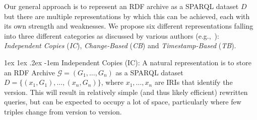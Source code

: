 \documentclass[a4paper]{llncs}
\makeatletter
\renewcommand\paragraph{\@startsection{paragraph}{4}{\z@}%
	{1ex \@plus1ex \@minus.2ex}%
	{-1em}%
	{\normalfont\normalsize\itshape}}
\makeatother
\begin{document}
Our general approach is to represent an RDF archive as a SPARQL dataset $D$ but there are multiple representations by which this can be achieved, each with its own strength and weaknesses. We propose six different representations falling into three different categories as discussed by various authors (e.g.,~\cite{TzitzikasTA08,FernandezPU15}): \textit{Independent Copies} (\textit{IC}), \textit{Change-Based} (\textit{CB}) and \textit{Timestamp-Based} (\textit{TB}).

\newcommand{\ic}{\textsc{i}\xspace}
\newcommand{\cbpd}{\ensuremath{\textsc{c}_d^{+}}\xspace}
\newcommand{\cbpi}{\ensuremath{\textsc{c}_i^{+}}\xspace}
\newcommand{\cbmd}{\ensuremath{\textsc{c}_d^{-}}\xspace}
\newcommand{\cbmi}{\ensuremath{\textsc{c}_i^{-}}\xspace}
\newcommand{\cbi}{\ensuremath{\textsc{c}_i}\xspace}
\newcommand{\cbd}{\ensuremath{\textsc{c}_d}\xspace}
\newcommand{\cbp}{\ensuremath{\textsc{c}^{+}}\xspace}
\newcommand{\cbm}{\ensuremath{\textsc{c}^{-}}\xspace}
\newcommand{\tb}{\textsc{t}\xspace}

\paragraph{Independent Copies (IC):} A natural representation is to store an RDF Archive $\mathcal{G} = (G_1,\ldots,G_n)$ as a SPARQL dataset $D = \{ (x_1,G_1), \ldots, (x_n,G_n)\}$, where $x_1,\ldots,x_n$ are IRIs that identify the version. This will result in relatively simple (and thus likely efficient) rewritten queries, but can be expected to occupy a lot of space, particularly where few triples change from version to version. %
\end{document}
